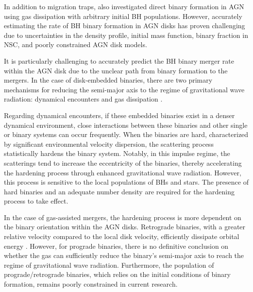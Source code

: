 \documentclass[fleqn,usenatbib]{mnras}
\begin{document}
In addition to migration traps, \citet{Li2023,Rowan2022,Rozner2023,Delaurentiis2023} also investigated direct binary formation in AGN using gas dissipation with arbitrary initial BH populations. However, accurately estimating the rate of BH binary formation in AGN disks has proven challenging due to uncertainties in the density profile, initial mass function, binary fraction in NSC, and poorly constrained AGN disk models.

It is particularly challenging to accurately predict the BH binary merger rate within the AGN disk due to the unclear path from binary formation to the mergers. In the case of disk-embedded binaries, there are two primary mechanisms for reducing the semi-major axis to the regime of gravitational wave radiation: dynamical encounters \citep{Tagawa2021,Tagawa2021b,Wang2021,Samsing2022} and gas dissipation \citep{Baruteau2011,Li2022,LiR2023,Li2023b,Kaaz2023}.

Regarding dynamical encounters, if these embedded binaries exist in a denser dynamical environment, close interactions between these binaries and other single or binary systems can occur frequently. When the binaries are hard, characterized by significant environmental velocity dispersion, the scattering process statistically hardens the binary system. Notably, in this impulse regime, the scatterings tend to increase the eccentricity of the binaries, thereby accelerating the hardening process through enhanced gravitational wave radiation. However, this process is sensitive to the local populations of BHs and stars. The presence of hard binaries and an adequate number density are required for the hardening process to take effect.

In the case of gas-assisted mergers, the hardening process is more dependent on the binary orientation within the AGN disks. Retrograde binaries, with a greater relative velocity compared to the local disk velocity, efficiently dissipate orbital energy \citep{Li2023b}. However, for prograde binaries, there is no definitive conclusion on whether the gas can sufficiently reduce the binary's semi-major axis to reach the regime of gravitational wave radiation. Furthermore, the population of prograde/retrograde binaries, which relies on the initial conditions of binary formation, remains poorly constrained in current research.
\end{document}
